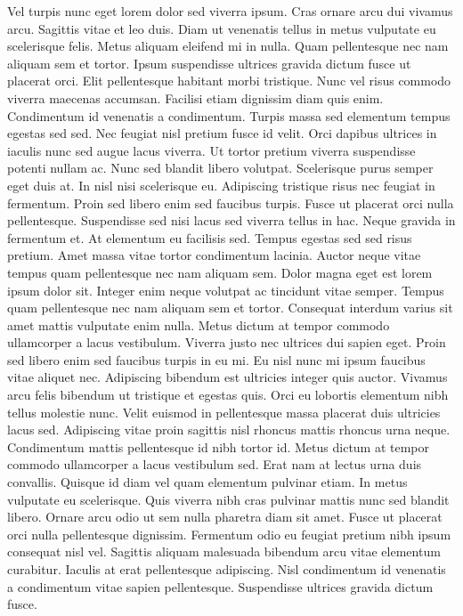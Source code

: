 ﻿\documentclass[11pt,a4paper,twocolumn]{article}         	%
\begin{document}
Vel turpis nunc eget lorem dolor sed viverra ipsum. Cras ornare arcu dui vivamus arcu. Sagittis vitae et leo duis. Diam ut venenatis tellus in metus vulputate eu scelerisque felis. Metus aliquam eleifend mi in nulla. Quam pellentesque nec nam aliquam sem et tortor. Ipsum suspendisse ultrices gravida dictum fusce ut placerat orci. Elit pellentesque habitant morbi tristique. Nunc vel risus commodo viverra maecenas accumsan. Facilisi etiam dignissim diam quis enim. Condimentum id venenatis a condimentum. Turpis massa sed elementum tempus egestas sed sed. Nec feugiat nisl pretium fusce id velit. Orci dapibus ultrices in iaculis nunc sed augue lacus viverra. Ut tortor pretium viverra suspendisse potenti nullam ac.
Nunc sed blandit libero volutpat. Scelerisque purus semper eget duis at. In nisl nisi scelerisque eu. Adipiscing tristique risus nec feugiat in fermentum. Proin sed libero enim sed faucibus turpis. Fusce ut placerat orci nulla pellentesque. Suspendisse sed nisi lacus sed viverra tellus in hac. Neque gravida in fermentum et. At elementum eu facilisis sed. Tempus egestas sed sed risus pretium. Amet massa vitae tortor condimentum lacinia. Auctor neque vitae tempus quam pellentesque nec nam aliquam sem. Dolor magna eget est lorem ipsum dolor sit. Integer enim neque volutpat ac tincidunt vitae semper. Tempus quam pellentesque nec nam aliquam sem et tortor. Consequat interdum varius sit amet mattis vulputate enim nulla. Metus dictum at tempor commodo ullamcorper a lacus vestibulum. Viverra justo nec ultrices dui sapien eget. Proin sed libero enim sed faucibus turpis in eu mi.
Eu nisl nunc mi ipsum faucibus vitae aliquet nec. Adipiscing bibendum est ultricies integer quis auctor. Vivamus arcu felis bibendum ut tristique et egestas quis. Orci eu lobortis elementum nibh tellus molestie nunc. Velit euismod in pellentesque massa placerat duis ultricies lacus sed. Adipiscing vitae proin sagittis nisl rhoncus mattis rhoncus urna neque. Condimentum mattis pellentesque id nibh tortor id. Metus dictum at tempor commodo ullamcorper a lacus vestibulum sed. Erat nam at lectus urna duis convallis. Quisque id diam vel quam elementum pulvinar etiam. In metus vulputate eu scelerisque. Quis viverra nibh cras pulvinar mattis nunc sed blandit libero. Ornare arcu odio ut sem nulla pharetra diam sit amet. Fusce ut placerat orci nulla pellentesque dignissim. Fermentum odio eu feugiat pretium nibh ipsum consequat nisl vel. Sagittis aliquam malesuada bibendum arcu vitae elementum curabitur. Iaculis at erat pellentesque adipiscing. Nisl condimentum id venenatis a condimentum vitae sapien pellentesque. Suspendisse ultrices gravida dictum fusce.
\end{document}
